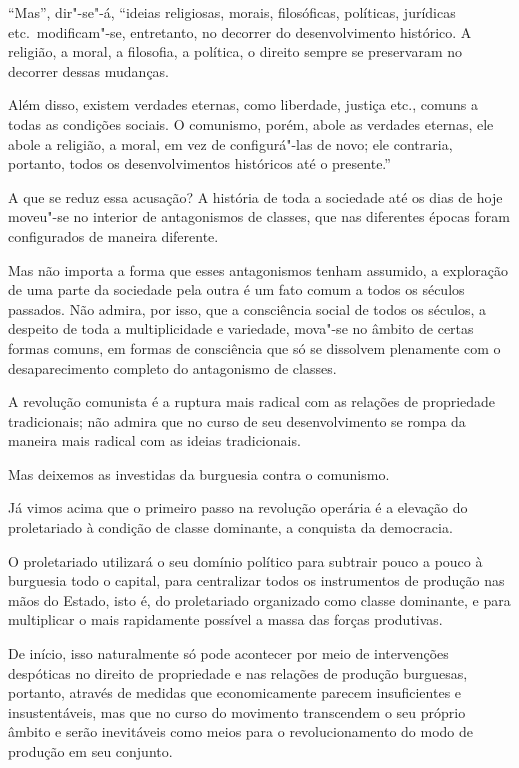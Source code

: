``Mas'', dir"-se"-á, ``ideias religiosas, morais, filosóficas, políticas,
jurídicas etc.~modificam"-se, entretanto, no decorrer do
desenvolvimento histórico. A religião, a moral, a filosofia, a
política, o direito sempre se preservaram no decorrer dessas mudanças.

Além disso, existem verdades eternas, como liberdade, justiça etc.,
comuns a todas as condições sociais. O comunismo, porém, abole as
verdades eternas, ele abole a religião, a moral, em vez de
configurá"-las de novo; ele contraria, portanto, todos os
desenvolvimentos históricos até o presente.''

A que se reduz essa acusação? A história de toda a sociedade até os dias
de hoje moveu"-se no interior de antagonismos de classes, que nas
diferentes épocas foram configurados de maneira diferente.

Mas não importa a forma que esses antagonismos tenham assumido, a
exploração de uma parte da sociedade pela outra é um fato comum a todos
os séculos passados. Não admira, por isso, que a consciência social de
todos os séculos, a despeito de toda a multiplicidade e variedade,
mova"-se no âmbito de certas formas comuns, em formas de consciência
que só se dissolvem plenamente com o desaparecimento completo do
antagonismo de classes.

A revolução comunista é a ruptura mais radical com as relações de
propriedade tradicionais; não admira que no curso de seu
desenvolvimento se rompa da maneira mais radical com as ideias
tradicionais.

Mas deixemos as investidas da burguesia contra o comunismo.

Já vimos acima que o primeiro passo na revolução operária é a elevação
do proletariado à condição de classe dominante, a conquista da
democracia.

O proletariado utilizará o seu domínio político para subtrair pouco a
pouco à burguesia todo o capital, para centralizar todos os
instrumentos de produção nas mãos do Estado, isto é, do proletariado
organizado como classe dominante, e para multiplicar o mais rapidamente
possível a massa das forças produtivas.

De início, isso naturalmente só pode acontecer por meio de intervenções
despóticas no direito de propriedade e nas relações de produção
burguesas, portanto, através de medidas que economicamente parecem
insuficientes e insustentáveis, mas que no curso do movimento
transcendem o seu próprio âmbito e serão inevitáveis como meios para o
revolucionamento do modo de produção em seu conjunto.

